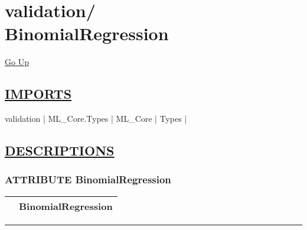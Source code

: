 \chapter*{\color{headfile}
{\large validation\slash\hspace{0pt}}
 \\
BinomialRegression
}
\hypertarget{ecldoc:toc:validation.BinomialRegression}{}
\hyperlink{ecldoc:toc:root/validation}{Go Up}

\section*{\underline{\textsf{IMPORTS}}}
\begin{doublespace}
{\large
validation |
ML\_Core.Types |
ML\_Core |
Types |
}
\end{doublespace}

\section*{\underline{\textsf{DESCRIPTIONS}}}
\subsection*{\textsf{\colorbox{headtoc}{\color{white} ATTRIBUTE}
BinomialRegression}}

\hypertarget{ecldoc:validation.binomialregression}{}

{\renewcommand{\arraystretch}{1.5}
\begin{tabularx}{\textwidth}{|>{\raggedright\arraybackslash}l|X|}
\hline
\hspace{0pt}\mytexttt{\color{red} } & \textbf{BinomialRegression} \\
\hline
\end{tabularx}
}

\par


\rule{\linewidth}{0.5pt}
